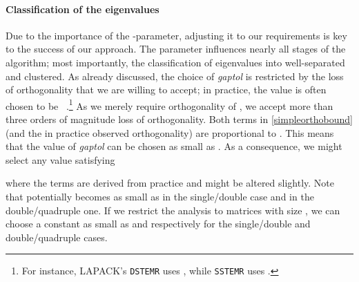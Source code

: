 \documentclass[final]{siamltex}
\begin{document}
\paragraph{Classification of the eigenvalues} Due to the importance of the
-parameter, adjusting it to our requirements is key to the success
of our approach. The parameter influences nearly all stages of the
algorithm; most importantly, the classification of eigenvalues into
well-separated and clustered. As already discussed, the choice of {\it
  gaptol} is restricted by the loss of orthogonality that we are willing to
accept; in practice, the value is often
chosen to be ~\cite{Dhillon:2004:MRRR}.\footnote{For instance,
  LAPACK's {\tt DSTEMR} uses , while {\tt SSTEMR} uses .} As we merely require 
orthogonality of , we accept
more than three orders of magnitude loss of orthogonality. Both terms in
\eqref{simpleorthobound} (and the in practice observed orthogonality)
are proportional to . This means that the value of {\it gaptol} can be chosen as small as . As a consequence, we might select any
 value satisfying

 where the  terms are derived from practice and might be altered slightly.
 Note that  potentially becomes as small
 as  in the single/double case and  in the
 double/quadruple one. If we restrict the analysis to matrices with size , we can
 choose a constant  as small as  and  
 respectively for the single/double and double/quadruple cases. 
 
\end{document}

